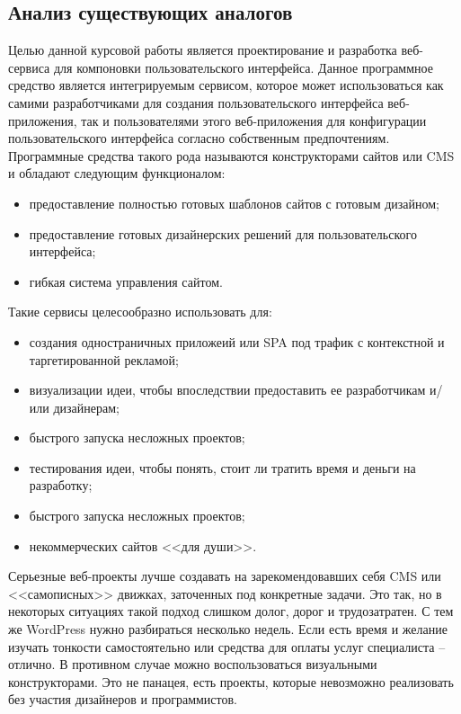 \subsection{Анализ существующих аналогов}
\label{sec:analysis:analogues}

Целью данной курсовой работы является проектирование и разработка веб-сервиса для компоновки пользовательского интерфейса. 
Данное программное средство является интегрируемым сервисом, которое может использоваться как самими разработчиками для создания пользовательского интерфейса веб-приложения, так и пользователями этого веб-приложения для конфигурации пользовательского интерфейса согласно собственным предпочтениям.
Программные средства такого рода называются конструкторами сайтов или CMS~\cite{cms} и обладают следующим функционалом:

\begin{itemize}
  \item предоставление полностью готовых шаблонов сайтов с готовым дизайном;
  \item предоставление готовых дизайнерских решений для пользовательского интерфейса;
  \item гибкая система управления сайтом.
\end{itemize}

Такие сервисы целесообразно использовать для:
\begin{itemize}
  \item создания одностраничных приложеий или SPA под трафик с контекстной и таргетированной рекламой;
  \item визуализации идеи, чтобы впоследствии предоставить ее разработчикам и/или дизайнерам;
  \item быстрого запуска несложных проектов;
  \item тестирования идеи, чтобы понять, стоит ли тратить время и деньги на разработку;
  \item быстрого запуска несложных проектов;
  \item некоммерческих сайтов <<для души>>.
\end{itemize}	

Серьезные веб-проекты лучше создавать на зарекомендовавших себя CMS или <<самописных>> движках, заточенных под конкретные задачи. Это так, но в некоторых ситуациях такой подход слишком долог, дорог и трудозатратен. С тем же WordPress нужно разбираться несколько недель. Если есть время и желание изучать тонкости самостоятельно или средства для оплаты услуг специалиста -- отлично. В противном случае можно воспользоваться визуальными конструкторами. Это не панацея, есть проекты, которые невозможно реализовать без участия дизайнеров и программистов.

